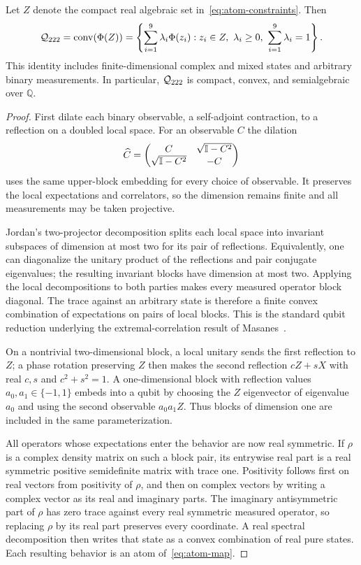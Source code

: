 \begin{theorem}\label{thm:physical}
Let $Z$ denote the compact real algebraic set in~\eqref{eq:atom-constraints}. Then
\[
 \Q=\operatorname{conv}(\Phi(Z))
 =\left\{\sum_{i=1}^{9}\lambda_i\Phi(z_i):
       z_i\in Z,\ \lambda_i\ge0,\ \sum_{i=1}^{9}\lambda_i=1\right\}.
\]
This identity includes finite-dimensional complex and mixed states and arbitrary binary measurements. In particular, ${\mathcal Q_{222}}$ is compact, convex, and semialgebraic over $\mathbb Q$.
\end{theorem}
\begin{proof}
First dilate each binary observable, a self-adjoint contraction, to a reflection on a doubled local space. For an observable $C$ the dilation
\[
 \widehat C=\begin{pmatrix}C&\sqrt{\mathbb I-C^2}\\
             \sqrt{\mathbb I-C^2}&-C\end{pmatrix}
\]
uses the same upper-block embedding for every choice of observable. It preserves the local expectations and correlators, so the dimension remains finite and all measurements may be taken projective.

Jordan's two-projector decomposition splits each local space into invariant subspaces of dimension at most two for its pair of reflections. Equivalently, one can diagonalize the unitary product of the reflections and pair conjugate eigenvalues; the resulting invariant blocks have dimension at most two. Applying the local decompositions to both parties makes every measured operator block diagonal. The trace against an arbitrary state is therefore a finite convex combination of expectations on pairs of local blocks. This is the standard qubit reduction underlying the extremal-correlation result of Masanes~\cite{Masanes}.

On a nontrivial two-dimensional block, a local unitary sends the first reflection to $Z$; a phase rotation preserving $Z$ then makes the second reflection $cZ+sX$ with real $c,s$ and $c^2+s^2=1$. A one-dimensional block with reflection values $a_0,a_1\in\{-1,1\}$ embeds into a qubit by choosing the $Z$ eigenvector of eigenvalue $a_0$ and using the second observable $a_0a_1Z$. Thus blocks of dimension one are included in the same parameterization.

All operators whose expectations enter the behavior are now real symmetric. If $\rho$ is a complex density matrix on such a block pair, its entrywise real part is a real symmetric positive semidefinite matrix with trace one. Positivity follows first on real vectors from positivity of $\rho$, and then on complex vectors by writing a complex vector as its real and imaginary parts. The imaginary antisymmetric part of $\rho$ has zero trace against every real symmetric measured operator, so replacing $\rho$ by its real part preserves every coordinate. A real spectral decomposition then writes that state as a convex combination of real pure states. Each resulting behavior is an atom of~\eqref{eq:atom-map}.


\end{proof}
